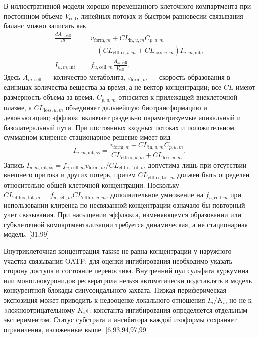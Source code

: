 \documentclass[11pt]{article}
\begin{document}
В иллюстративной модели хорошо перемешанного клеточного компартмента при постоянном объеме \(V_{\mathrm{cell}}\), линейных потоках и быстром равновесии связывания баланс можно записать как
\[
\begin{aligned}
\frac{dA_{m,\mathrm{cell}}}{dt}
&=v_{\mathrm{form},m}+CL_{\mathrm{in},u,m}C_{p,u,m}\\
&\quad-\left(CL_{\mathrm{efflux},u,m}+CL_{\mathrm{loss},u,m}\right)
I_{u,m,\mathrm{int}},\\
I_{u,m,\mathrm{int}}
&=f_{u,\mathrm{cell},m}\frac{A_{m,\mathrm{cell}}}{V_{\mathrm{cell}}}.
\end{aligned}
\]
Здесь \(A_{m,\mathrm{cell}}\) --- количество метаболита, \(v_{\mathrm{form},m}\) --- скорость образования в единицах количества вещества за время, а не вектор концентрации; все \(CL\) имеют размерность объема за время. \(C_{p,u,m}\) относится к прилежащей внеклеточной плазме, а \(CL_{\mathrm{loss},u,m}\) объединяет дальнейшую биотрансформацию и деконъюгацию; эффлюкс включает раздельно параметризуемые апикальный и базолатеральный пути. При постоянных входных потоках и положительном суммарном клиренсе стационарное решение имеет вид
\[
I_{u,m,\mathrm{int,ss}}=
\frac{v_{\mathrm{form},m}+CL_{\mathrm{in},u,m}C_{p,u,m}}
{CL_{\mathrm{efflux},u,m}+CL_{\mathrm{loss},u,m}}.
\]
Запись \(I_{u,m,\mathrm{int,ss}}=f_{u,\mathrm{cell},m}v_{\mathrm{form},m}/CL_{\mathrm{efflux},\mathrm{tot},m}\) допустима лишь при отсутствии внешнего притока и других потерь, причем \(CL_{\mathrm{efflux},\mathrm{tot},m}\) должен быть определен относительно общей клеточной концентрации. Поскольку \(CL_{\mathrm{efflux},\mathrm{tot},m}=f_{u,\mathrm{cell},m}CL_{\mathrm{efflux},u,m}\), дополнительное умножение на \(f_{u,\mathrm{cell},m}\) при использовании клиренса по несвязанной концентрации означало бы повторный учет связывания. При насыщении эффлюкса, изменяющемся образовании или субклеточной компартментализации требуется динамическая, а не стационарная модель. [31,99]

Внутриклеточная концентрация также не равна концентрации у наружного участка связывания OATP: для оценки ингибирования необходимо указать сторону доступа и состояние переносчика. Внутренний пул сульфата куркумина или моноглюкуронидов ресвератрола нельзя автоматически подставлять в модель конкурентной блокады синусоидального захвата. Низкая периферическая экспозиция может приводить к недооценке локального отношения \(I_u/K_i\), но не к «ложноотрицательному \(K_i\)»: константа ингибирования определяется отдельным экспериментом. Статус субстрата и ингибитора каждой изоформы сохраняет ограничения, изложенные выше. [6,93,94,97,99]
\end{document}
